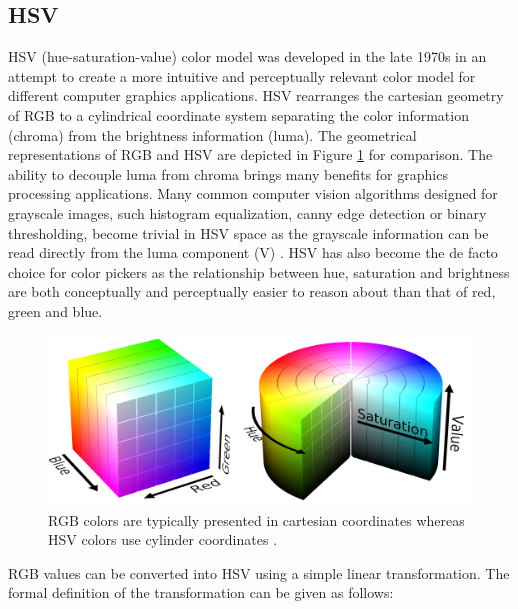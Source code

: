 \documentclass[thesis.tex]{subfiles}
\begin{document}
\subsection{HSV}

HSV (hue-saturation-value) color model was developed in the late 1970s in an attempt to create a more intuitive and perceptually relevant color model for different computer graphics applications. HSV rearranges the cartesian geometry of RGB to a cylindrical coordinate system separating the color information (chroma) from the brightness information (luma). The geometrical representations of RGB and HSV are depicted in Figure \ref{figure:rgb_hsv} for comparison. The ability to decouple luma from chroma brings many benefits for graphics processing applications. Many common computer vision algorithms designed for grayscale images, such histogram equalization, canny edge detection or binary thresholding, become trivial in HSV space as the grayscale information can be read directly from the luma component (V) \cite{color_segmentation}. HSV has also become the de facto choice for color pickers as the relationship between hue, saturation and brightness are both conceptually and perceptually easier to reason about than that of red, green and blue.

\begin{figure}[hb]
\centering \includegraphics[width=\textwidth]{images/rgb_hsv}
\caption{RGB colors are typically presented in cartesian coordinates whereas HSV colors use cylinder coordinates \cite{hsv_cylinder}\cite{rgb_cube}.\label{figure:rgb_hsv}}
\end{figure}

RGB values can be converted into HSV using a simple linear transformation. The formal definition of the transformation can be given as follows:
\end{document}
